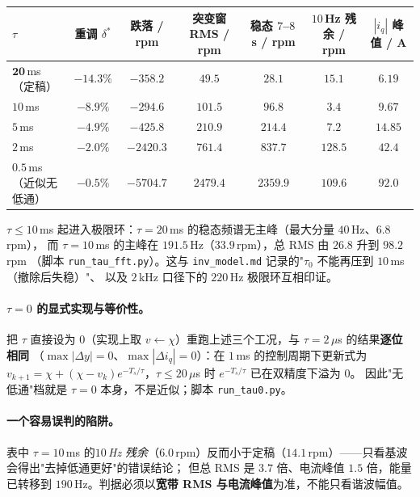 \documentclass[11pt,a4paper]{article}
\theoremstyle{remark}\newtheorem{remark}{注}
\begin{document}
\begin{center}\footnotesize
\setlength{\tabcolsep}{3.2pt}
\begin{tabular}{@{}lcccccc@{}}
\toprule
$\tau$ & 重调 $\delta^{*}$ & 跌落 / rpm & 突变窗 RMS / rpm & 稳态 $7$--$8$\,s / rpm & $10$\,Hz 残余 / rpm & $|i_q|$ 峰值 / A\\
\midrule
$\mathbf{20}$\,ms（定稿） & $-14.3\%$ & $-358.2$ & $49.5$ & $\mathbf{28.1}$ & $15.1$ & $\mathbf{6.19}$\\
$10$\,ms & $-8.9\%$ & $-294.6$ & $101.5$ & $96.8$ & $3.4$ & $9.67$\\
$5$\,ms & $-4.9\%$ & $-425.8$ & $210.9$ & $214.4$ & $7.2$ & $14.85$\\
$2$\,ms & $-2.0\%$ & $-2420.3$ & $761.4$ & $837.7$ & $128.5$ & $42.4$\\
$0.5$\,ms（近似无低通） & $-0.5\%$ & $-5704.7$ & $2479.4$ & $2359.9$ & $109.6$ & $92.0$\\
\bottomrule
\end{tabular}
\end{center}

$\tau\le10$\,ms 起进入极限环：$\tau=20$\,ms 的稳态频谱无主峰（最大分量 $40$\,Hz、$6.8$\,rpm），
而 $\tau=10$\,ms 的主峰在 $\mathbf{191.5}$\,Hz（$33.9$\,rpm），总 RMS 由 $26.8$ 升到 $98.2$\,rpm
（脚本 \texttt{run\_tau\_fft.py}）。这与 \texttt{inv\_model.md} 记录的"$\tau_0$ 不能再压到 $10$\,ms（撤除后失稳）"、
以及 $2$\,kHz 口径下的 $220$\,Hz 极限环互相印证。

\paragraph{$\tau=0$ 的显式实现与等价性。}
把 $\tau$ 直接设为 $0$（实现上取 $v\leftarrow\chi$）重跑上述三个工况，与 $\tau=2\,\mu$s 的结果\textbf{逐位相同}
（$\max|\Delta y|=0$、$\max|\Delta i_q|=0$）：在 $1$\,ms 的控制周期下更新式为
$v_{k+1}=\chi+(\chi-v_k)e^{-T_s/\tau}$，$\tau\le20\,\mu$s 时 $e^{-T_s/\tau}$ 已在双精度下溢为 $0$。
因此"无低通"档就是 $\tau=0$ 本身，不是近似；脚本 \texttt{run\_tau0.py}。

\paragraph{一个容易误判的陷阱。}
表中 $\tau=10$\,ms 的\emph{$10$\,Hz 残余}（$6.0$\,rpm）反而小于定稿（$14.1$\,rpm）——只看基波会得出"去掉低通更好"的错误结论；
但总 RMS 是 $3.7$ 倍、电流峰值 $1.5$ 倍，能量已转移到 $190$\,Hz。判据必须以\textbf{宽带 RMS 与电流峰值}为准，不能只看谐波幅值。
\end{document}
